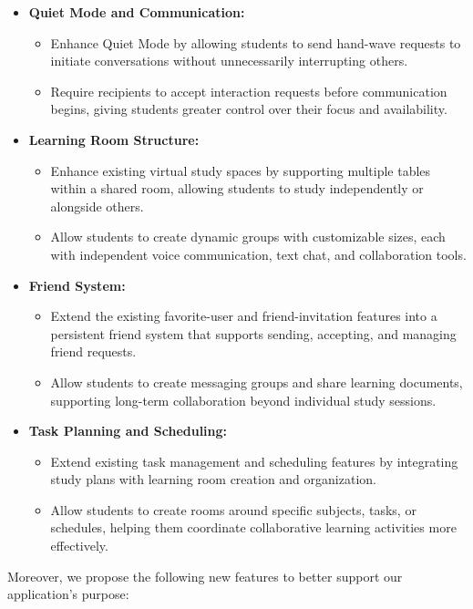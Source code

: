 \documentclass[12pt]{article}
\begin{document}
\begin{itemize}
    \item \textbf{Quiet Mode and Communication:}
    \begin{itemize}
        \item Enhance Quiet Mode by allowing students to send hand-wave requests to initiate conversations without unnecessarily interrupting others.
        \item Require recipients to accept interaction requests before communication begins, giving students greater control over their focus and availability.
    \end{itemize}
    \item \textbf{Learning Room Structure:}
    \begin{itemize}
        \item Enhance existing virtual study spaces by supporting multiple tables within a shared room, allowing students to study independently or alongside others.
        \item Allow students to create dynamic groups with customizable sizes, each with independent voice communication, text chat, and collaboration tools.
    \end{itemize}
    \item \textbf{Friend System:}
    \begin{itemize}
        \item Extend the existing favorite-user and friend-invitation features into a persistent friend system that supports sending, accepting, and managing friend requests.
        \item Allow students to create messaging groups and share learning documents, supporting long-term collaboration beyond individual study sessions.
    \end{itemize}
    \item \textbf{Task Planning and Scheduling:}
    \begin{itemize}
        \item Extend existing task management and scheduling features by integrating study plans with learning room creation and organization.
        \item Allow students to create rooms around specific subjects, tasks, or schedules, helping them coordinate collaborative learning activities more effectively.
    \end{itemize}
\end{itemize}

Moreover, we propose the following new features to better support our application's purpose:
\end{document}
